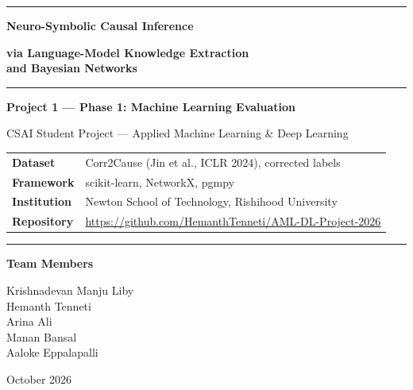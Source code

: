 \documentclass[12pt,a4paper]{article}
\newcommand{\MemberA}{Krishnadevan Manju Liby}
\newcommand{\MemberB}{Hemanth Tenneti}
\newcommand{\MemberC}{Arina Ali}
\newcommand{\MemberD}{Manan Bansal}
\newcommand{\MemberE}{Aaloke Eppalapalli}
\newcommand{\Institution}{Newton School of Technology, Rishihood University}
\newcommand{\Course}{CSAI Student Project --- Applied Machine Learning \& Deep Learning}
\newcommand{\RepoURL}{https://github.com/HemanthTenneti/AML-DL-Project-2026}
\newcommand{\ReportDate}{October 2026}
\begin{document}
\begin{titlepage}
\centering
\vspace*{2.2cm}
{\color{navy}\rule{\linewidth}{0.8pt}}\par\vspace{1.0cm}
{\Huge\bfseries\color{navy} Neuro-Symbolic Causal Inference\par}
\vspace{0.4cm}
{\Large\bfseries\color{navy} via Language-Model Knowledge Extraction\\[0.15em] and Bayesian Networks\par}
\vspace{0.9cm}
{\color{navy}\rule{\linewidth}{0.8pt}}\par\vspace{1.1cm}
{\large\bfseries\color{accent} Project 1 --- Phase 1: Machine Learning Evaluation\par}
\vspace{0.6cm}
{\large \Course\par}
\vspace{1.2cm}
\begin{tabular}{@{}>{\bfseries}l l@{}}
Dataset     & Corr2Cause (Jin et al., ICLR 2024), corrected labels \\
Framework   & scikit-learn, NetworkX, pgmpy \\
Institution & \Institution \\
Repository  & \small\url{\RepoURL} \\
\end{tabular}
\par\vspace{1.4cm}
{\color{navy}\rule{0.6\linewidth}{0.6pt}}\par\vspace{0.6cm}
{\large\bfseries Team Members\par}\vspace{0.2cm}
{\large \MemberA\\ \MemberB\\ \MemberC\\ \MemberD\\ \MemberE\par}
\vfill
{\large \ReportDate\par}
\end{titlepage}

\setcounter{page}{1}
\setcounter{tocdepth}{2}
\tableofcontents
\newpage
\end{document}
